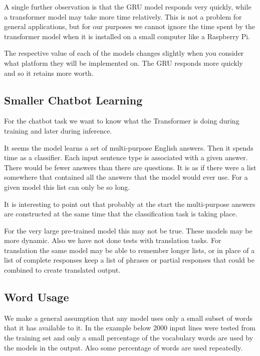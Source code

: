 A single further observation is that the GRU model responds very quickly, while a transformer model may take more time relatively. This is not a problem for general applications, but for our purposes we cannot ignore the time spent by the transformer model when it is installed on a small computer like a Raspberry Pi. 

The respective value of each of the models changes slightly when you consider what platform they will be implemented on. The GRU responds more quickly and so it retains more worth.

\subsection{Smaller Chatbot Learning}

For the chatbot task we want to know what the Transformer is doing during training and later during inference.

It seems the model learns a set of multi-purpose English answers. Then it spends time as a classifier. Each input sentence type is associated with a given answer. There would be fewer answers than there are questions. It is as if there were a list somewhere that contained all the answers that the model would ever use. For a given model this list can only be so long.

It is interesting to point out that probably at the start the multi-purpose answers are constructed at the same time that the classification task is taking place. 

For the very large pre-trained model this may not be true. These models may be more dynamic. Also we have not done tests with translation tasks. For translation the same model may be able to remember longer lists, or in place of a list of complete responses keep a list of phrases or partial responses that could be combined to create translated output.

\subsection{Word Usage}

We make a general assumption that any model uses only a small subset of words that it has available to it. In the example below 2000 input lines were tested from the training set and only a small percentage of the vocabulary words are used by the models in the output. Also some percentage of words are used repeatedly.

